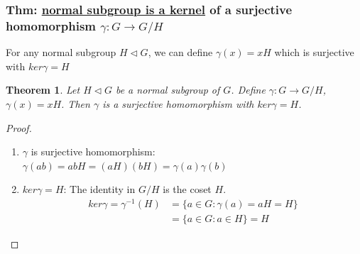 \documentclass[11pt,a4paper]{article}
\newtheorem{theorem}{Theorem}
\begin{document}
\subsubsection{Thm: \underline{normal subgroup is a kernel} of a surjective homomorphism $\gamma: G \rightarrow G/H$}
For any normal subgroup $H\lhd G$, we can define $\gamma(x)=xH$ which is surjective with $ker \gamma=H$
\begin{theorem}
Let $H \lhd G$ be a normal subgroup of $G$. Define $\gamma: G \rightarrow G/H$, $\gamma(x)=xH$. Then $\gamma$ is a surjective homomorphism with $ker \gamma=H$.
\end{theorem}
\begin{proof}
    \quad
\begin{enumerate}
    \item $\gamma$ is surjective homomorphism: $\gamma(ab)=abH=(aH)(bH)=\gamma(a)\gamma(b)$
    \item $ker\gamma=H$: The identity in $G/H$ is the coset $H$.
    \begin{equation}
        \begin{aligned}
            ker\gamma=\gamma^{-1}(H)&=\{a\in G: \gamma(a)=aH=H\}\\
            &=\{a\in G: a\in H\}=H
        \end{aligned}
        \nonumber
    \end{equation}
\end{enumerate}
\end{proof}
\end{document}
